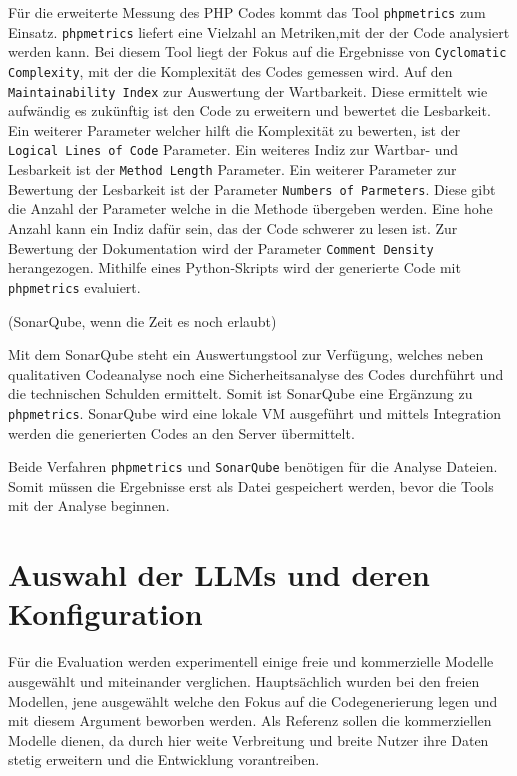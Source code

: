 Für die erweiterte Messung des PHP Codes kommt das Tool \texttt{phpmetrics} zum Einsatz. \texttt{phpmetrics} liefert eine Vielzahl an Metriken,mit der der Code analysiert werden kann. Bei diesem Tool liegt der Fokus auf die Ergebnisse von \texttt{Cyclomatic Complexity}, mit der die Komplexität des Codes gemessen wird. Auf den \texttt{Maintainability Index} zur Auswertung der Wartbarkeit. Diese ermittelt wie aufwändig es zukünftig ist den Code zu erweitern und bewertet die Lesbarkeit. Ein weiterer Parameter welcher hilft die Komplexität zu bewerten, ist der \texttt{Logical Lines of Code} Parameter. Ein weiteres Indiz zur Wartbar- und Lesbarkeit ist der \texttt{Method Length} Parameter. Ein weiterer Parameter zur Bewertung der Lesbarkeit ist der Parameter \texttt{Numbers of Parmeters}. Diese gibt die Anzahl der Parameter welche in die Methode übergeben werden. Eine hohe Anzahl kann ein Indiz dafür sein, das der Code schwerer zu lesen ist. Zur Bewertung der Dokumentation wird der Parameter \texttt{Comment Density} herangezogen.
Mithilfe eines Python-Skripts wird der generierte Code mit \texttt{phpmetrics} evaluiert.\vspace{0.2cm}

(SonarQube, wenn die Zeit es noch erlaubt)

Mit dem SonarQube steht ein Auswertungstool zur Verfügung, welches neben qualitativen Codeanalyse noch eine Sicherheitsanalyse des Codes durchführt und die technischen Schulden ermittelt. Somit ist SonarQube eine Ergänzung zu \texttt{phpmetrics}. SonarQube wird eine lokale VM ausgeführt und mittels Integration werden die generierten Codes an den Server übermittelt.\vspace{0.2cm}

Beide Verfahren \texttt{phpmetrics} und \texttt{SonarQube} benötigen für die Analyse Dateien. Somit müssen die Ergebnisse erst als Datei gespeichert werden, bevor die Tools mit der Analyse beginnen.



\section{Auswahl der LLMs und deren Konfiguration}\label{subsec:llm_selection}

Für die Evaluation werden experimentell einige freie und kommerzielle Modelle ausgewählt und miteinander verglichen. Hauptsächlich wurden bei den freien Modellen, jene ausgewählt welche den Fokus auf die Codegenerierung legen und mit diesem Argument beworben werden. Als Referenz sollen die kommerziellen Modelle dienen, da durch hier weite Verbreitung und breite Nutzer ihre Daten stetig erweitern und die Entwicklung vorantreiben.\vspace{0.2cm}

